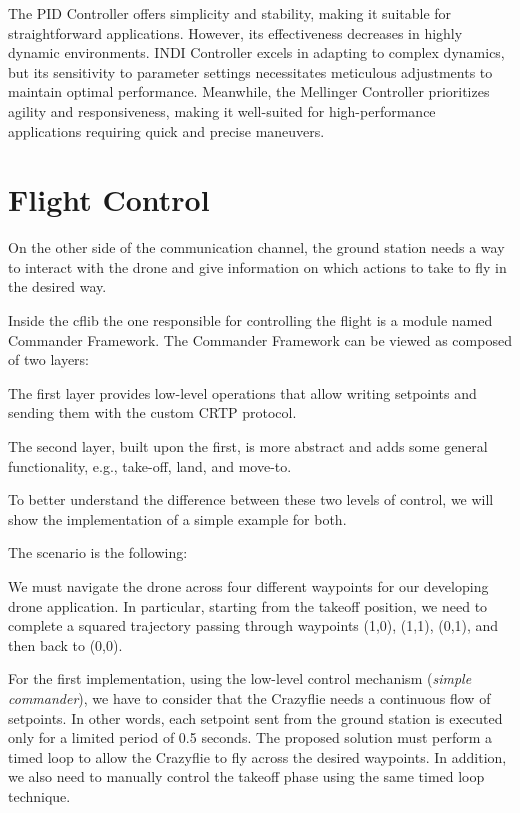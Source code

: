 The PID Controller offers simplicity and stability, making it suitable for straightforward applications. However, its effectiveness decreases in highly dynamic environments. 
INDI Controller excels in adapting to complex dynamics, but its sensitivity to parameter settings necessitates meticulous adjustments to maintain optimal performance.
Meanwhile, the Mellinger Controller prioritizes agility and responsiveness, making it well-suited for high-performance applications requiring quick and precise maneuvers. 


\section{Flight Control}\label{sec:flight_control}
On the other side of the communication channel, the ground station needs a way to interact with the drone and give information on which actions to take to fly in the desired way.


Inside the cflib the one responsible for controlling the flight is a module named Commander Framework.
The Commander Framework can be viewed as composed of two layers:

The first layer provides low-level operations that allow writing setpoints and sending them with the custom CRTP protocol.

The second layer, built upon the first, is more abstract and adds some general functionality, e.g., take-off, land, and move-to.

To better understand the difference between these two levels of control, we will show the implementation of a simple example for both.


The scenario is the following:
\begin{displayquote}
    We must navigate the drone across four different waypoints for our developing drone application.
    In particular, starting from the takeoff position, we need to complete a squared trajectory passing through waypoints (1,0), (1,1), (0,1), and then back to (0,0).
\end{displayquote}

For the first implementation, using the low-level control mechanism (\textit{simple commander}), we have to consider that the Crazyflie needs a continuous flow of setpoints. 
In other words, each setpoint sent from the ground station is executed only for a limited period of 0.5 seconds.
The proposed solution must perform a timed loop to allow the Crazyflie to fly across the desired waypoints.
In addition, we also need to manually control the takeoff phase using the same timed loop technique.

